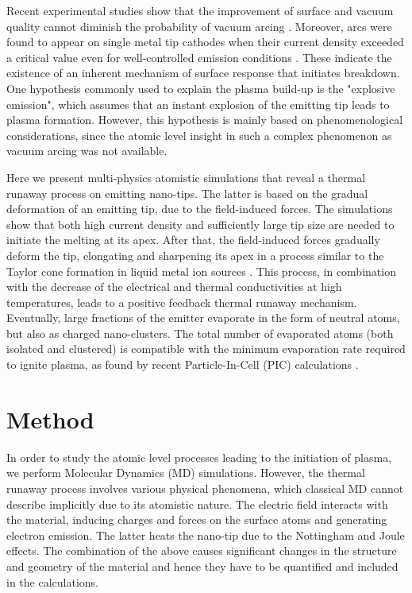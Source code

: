 \documentclass[%
 aps,
 prb,%
 amsmath,amssymb,
reprint,%
superscriptaddress,
]{revtex4-1}
\begin{document}
Recent experimental studies show that the improvement of surface and vacuum quality cannot diminish the probability of vacuum arcing \cite{Degiovani_conditioning}.
Moreover, arcs were found to appear on single metal tip cathodes when their current density exceeded a critical value even for well-controlled emission conditions \cite{Dyke1953Arc}. These indicate the existence of an inherent mechanism of surface response that initiates breakdown.
One hypothesis commonly used to explain the plasma build-up is the "explosive emission"\citep{Anders, Mesyats_Ecton, mesyats1993ectons, Mesyats2005}, which assumes that an instant explosion of the emitting tip leads to plasma formation.
However, this hypothesis is mainly based on phenomenological considerations, since the atomic level insight in such a complex phenomenon as vacuum arcing was not available. 

Here we present multi-physics atomistic simulations that reveal a thermal runaway process on emitting nano-tips. The latter is based on the gradual deformation of an emitting tip, due to the field-induced forces. 
The simulations show that both high current density and sufficiently large tip size are needed to initiate the melting at its apex. After that, the field-induced forces gradually deform the tip, elongating and sharpening its apex in a process similar to the Taylor cone formation in liquid metal ion sources \cite{krohn1975ion, Wagner1982hydrodynamics, Swanson_LMIS}. 
This process, in combination with the decrease of the electrical and thermal conductivities at high temperatures, leads to a positive feedback thermal runaway mechanism.
Eventually, large fractions of the emitter evaporate in the form of neutral atoms, but also as charged nano-clusters. 
The total number of evaporated atoms (both isolated and clustered) is compatible with the minimum evaporation rate required to ignite plasma, as found by recent Particle-In-Cell (PIC) calculations \cite{ArcPIC_1d, arcPIC}.

\section{Method} \label{sec:method}

In order to study the atomic level processes leading to the initiation of plasma, we perform  Molecular Dynamics (MD) simulations. 
However, the thermal runaway process involves various physical phenomena, which classical MD cannot describe implicitly due to its atomistic nature.
The electric field interacts with the material, inducing charges and forces on the surface atoms and generating electron emission. The latter heats the nano-tip due to the Nottingham \cite{Nottingham,NottingCharb} and Joule effects.
The combination of the above causes significant changes in the structure and  geometry of the material and hence they have to be quantified and included in the calculations. 
\end{document}
